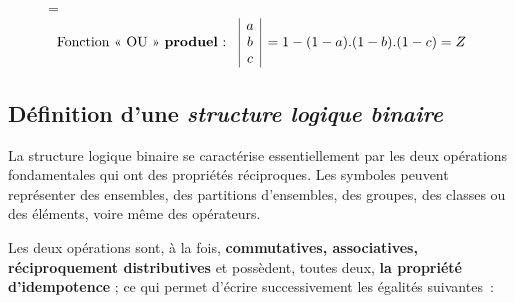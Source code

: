 \begin{figure}[htb]
 \vspace{1cm}

=\hbox{$\begin{array}{r|c|l}
 & a\\
\text{Fonction «  OU » {\bf produel} : }  & b & =1-(1-a).(1-b).(1-c)=Z\\
 & c
\end{array}$} 

\caption{}

\label{fig:OU} 
\end{figure}


\subsection{Définition d'une \emph{structure logique binaire}}

La structure logique binaire se caractérise essentiellement par les
deux opérations fondamentales qui ont des propriétés réciproques.
Les symboles peuvent représenter des ensembles, des partitions d'ensembles,
des groupes, des classes ou des éléments, voire même des opérateurs.

Les deux opérations sont, à la fois, \textbf{commutatives, associatives,
réciproquement distributives} et possèdent, toutes deux, \textbf{la
propriété d'idempotence} ; ce qui permet d'écrire successivement les
égalités suivantes~:

